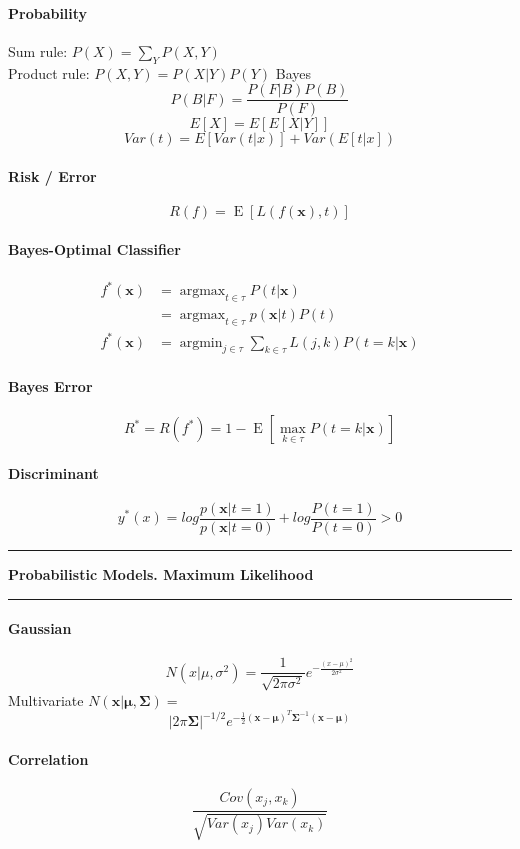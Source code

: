 \documentclass[7pt]{scrartcl}
\newlength{\secskip}
\renewcommand{\section}[1]{
  \vspace{\secskip}
  \hrule\vspace{.4em}
  \textbf{#1}
  \vspace{.4em}
  \hrule
  \vspace{\secskip}
}
\DeclareMathOperator*{\argmax}{argmax}
\DeclareMathOperator*{\argmin}{argmin}
\DeclareMathOperator{\E}{E}
\renewcommand{\vec}{\mathbf}
\begin{document}
\begin{multicols}{4}
\paragraph{Probability}
\[\]
Sum rule: $P(X) = \sum_Y P(X,Y)$\\
Product rule: $P(X,Y) = P(X|Y)P(Y)$
Bayes  \[P(B|F) = \frac{P(F|B)P(B)}{P(F)}\]
\[E[X] = E[E[X|Y]]\]
\[Var(t) = E[Var(t|x)] + Var(E[t|x]) \]
\paragraph{Risk / Error}
\[ R(f) = \E \left [ L(f(\vec x), t) \right ] \]

\paragraph{Bayes-Optimal Classifier}
\begin{align*}
f^*(\vec x) &= \argmax_{t \in \tau} P(t|\vec x) \\ 
&= \argmax_{t \in \tau} p(\vec x|t) P(t) \\
f^*(\vec x) &= \argmin_{j \in \tau} \sum_{k \in \tau} L(j,k) P(t = k | \vec x) \end{align*}

\paragraph{Bayes Error}
\[ R^* = R(f^*) = 1 - \E \left [ \max_{k\in\tau} P(t = k | \vec x) \right ] \]


\paragraph{Discriminant}
\[y^*(x) = log \frac{p(\vec{x}|t=1)}{p(\vec{x}|t=0)} + log \frac{P(t=1)}{P(t=0)} > 0\]
\section{Probabilistic Models. Maximum Likelihood}

\paragraph{Gaussian}
\[N(x|\mu,\sigma^2) = \frac{1}{\sqrt{2\pi\sigma^2}} e^{-\frac{(x-\mu)^2}{2\sigma^2}}\]
Multivariate $N(\vec{x}|\vec{\mu},\vec{\Sigma}) =$
\[|2\pi\vec{\Sigma}|^{-1/2} e^{-\frac{1}{2}(\vec{x}-\vec{\mu})^T\vec{\Sigma}^{-1}(\vec{x}-\vec{\mu})}\]

\paragraph{Correlation}
\[\frac{Cov(x_j,x_k)}{\sqrt{Var(x_j)Var(x_k)}}\]


\end{multicols}
\end{document}
